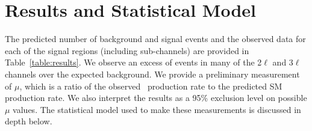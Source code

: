 \chapter[Results and Statistical Model][Results and Statistical Model]{Results and Statistical Model} 
\label{chapter:results} 


The predicted number of background and signal events and the observed data for each of the signal regions (including sub-channels) are provided in Table~\ref{table:results}. We observe an excess of events in many of the 2$\ell$ and 3$\ell$ channels over the expected background. We provide a preliminary measurement of $\mu$, which is a ratio of the observed \tth\ production rate to the predicted SM production rate. We also interpret the results as a 95\% exclusion level on possible $\mu$ values. The statistical model used to make these measurements is discussed in depth below.


